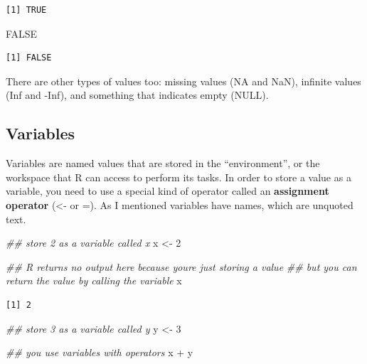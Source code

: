 \documentclass[
  letterpaper,
  DIV=11,
  numbers=noendperiod]{scrreprt}
\newenvironment{Shaded}{\begin{snugshade}}{\end{snugshade}}
\newcommand{\ConstantTok}[1]{\textcolor[rgb]{0.56,0.35,0.01}{#1}}
\newcommand{\DecValTok}[1]{\textcolor[rgb]{0.68,0.00,0.00}{#1}}
\newcommand{\DocumentationTok}[1]{\textcolor[rgb]{0.37,0.37,0.37}{\textit{#1}}}
\newcommand{\NormalTok}[1]{\textcolor[rgb]{0.00,0.23,0.31}{#1}}
\newcommand{\OtherTok}[1]{\textcolor[rgb]{0.00,0.23,0.31}{#1}}
\newcommand{\SpecialCharTok}[1]{\textcolor[rgb]{0.37,0.37,0.37}{#1}}
\begin{document}
\begin{verbatim}
[1] TRUE
\end{verbatim}

\begin{Shaded}
\begin{Highlighting}[]
\ConstantTok{FALSE}
\end{Highlighting}
\end{Shaded}

\begin{verbatim}
[1] FALSE
\end{verbatim}

There are other types of values too: missing values (NA and NaN),
infinite values (Inf and -Inf), and something that indicates empty
(NULL).

\subsection{Variables}\label{variables}

Variables are named values that are stored in the ``environment'', or
the workspace that R can access to perform its tasks. In order to store
a value as a variable, you need to use a special kind of operator called
an \textbf{assignment operator} (\textless- or =). As I mentioned
variables have names, which are unquoted text.

\begin{Shaded}
\begin{Highlighting}[]
\DocumentationTok{\#\# store 2 as a variable called x}
\NormalTok{x }\OtherTok{\textless{}{-}} \DecValTok{2}

\DocumentationTok{\#\# R returns no output here because you\textquotesingle{}re just storing a value}
\DocumentationTok{\#\# but you can return the value by calling the variable}
\NormalTok{x}
\end{Highlighting}
\end{Shaded}

\begin{verbatim}
[1] 2
\end{verbatim}

\begin{Shaded}
\begin{Highlighting}[]
\DocumentationTok{\#\# store 3 as a variable called y}
\NormalTok{y }\OtherTok{\textless{}{-}} \DecValTok{3}

\DocumentationTok{\#\# you use variables with operators}
\NormalTok{x }\SpecialCharTok{+}\NormalTok{ y}
\end{Highlighting}
\end{Shaded}
\end{document}
